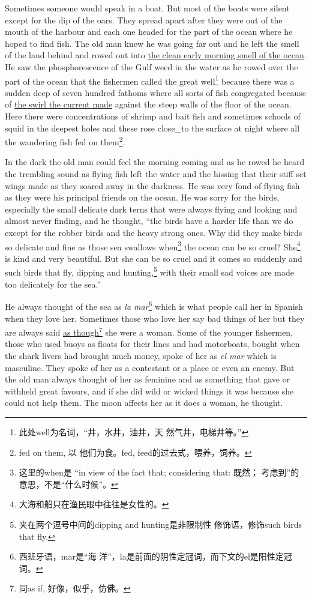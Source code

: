 \documentclass[fontset=ubuntu]{ctexrep}
\begin{document}
Sometimes someone would speak in a boat. But most of the boats were silent
except for the \gls{dip} of the oars. They spread \gls{apart} after they
were out of the mouth of the harbour and each one headed for the part of the
ocean where he hoped to find fish. The old man knew he was going far out and
he left the smell of the land behind and rowed out into \uline{the clean
  early morning smell of the ocean}. He saw the \gls{phosphorescence} of the
Gulf weed in the water as he rowed over the part of the ocean that the
fishermen called the great well\footnote{此处well为名词，“井，水井，油井，天
  然气井，电梯井等。”} because there was a \gls{sudden} deep of seven
hundred \glspl{fathom} where all sorts of fish \gls{congregated} because of
\uline{the \gls{swirl} the current made} against the \gls{steep} walls of
the floor of the ocean. Here there were \glspl{concentration} of
\gls{shrimp} and bait fish and sometimes \glspl{school} of \gls{squid} in
the deepest holes and these \gls{rose} \gls{close_to} the \gls{surface} at
night where all the \gls{wandering} fish fed on them\footnote{fed on them, 以
  他们为食。fed, feed的过去式，喂养，饲养。}.

In the dark the old man could feel the morning coming and as he rowed he
heard the \gls{trembling} sound as flying fish left the water and the
\gls{hissing} that their \gls{stiff} set \glspl{wing} made as they \gls{soared}
away in the darkness. He was very \gls{fond} of flying fish as they were his
\gls{principal} friends on the ocean. He was \gls{sorry} for the birds,
especially the small \gls{delicate} dark \glspl{tern} that were always flying and
looking and almost never finding, and he thought, ``the birds have a harder
life than we do except for the \gls{robber} birds and the heavy strong ones.
Why did they make birds so delicate and fine as those sea \glspl{swallow}
when\footnote{这里的when是 “in view of the fact that; considering that: 既然；
  考虑到”的意思，不是“什么时候”。} the ocean can be so \gls{cruel}?
She\footnote{大海和船只在渔民眼中往往是女性的。} is kind and very beautiful.
But she can be so cruel and it comes so suddenly and such birds that fly,
dipping and \gls{hunting},\footnote{夹在两个逗号中间的dipping and hunting是非限制性
  修饰语，修饰such birds that fly.} with their small sad voices are made too
\gls{delicately} for the sea.''

He always thought of the sea as \emph{la mar}\footnote{西班牙语，mar是“海
  洋”，la是前面的阴性定冠词，而下文的el是阳性定冠词。} which is what people
call her in Spanish when they love her. Sometimes those who love her say bad
things of her but they are always said \uline{as though}\footnote{同as if,
  好像，似乎，仿佛。} she were a woman. Some of
the younger fishermen, those who used \glspl{buoy} as \glspl{float} for
their lines and had motorboats, bought when the shark livers had brought
much money, spoke of her as \emph{el mar} which is \gls{masculine}. They
spoke of her as a \gls{contestant} or a place or even an \gls{enemy}. But
the old man always thought of her as \gls{feminine} and as something that
gave or \gls{withheld} great \glspl{favour}, and if she did wild or
\gls{wicked} things it was because she could not help them. The moon
\glspl{affect} her as it does a woman, he thought.
\end{document}
